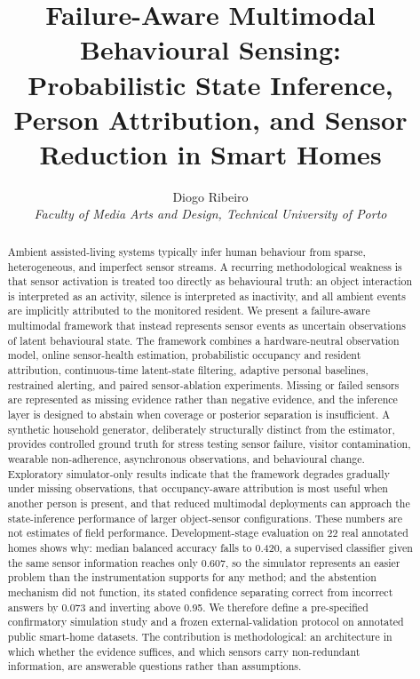 \documentclass[11pt]{article}
\title{Failure-Aware Multimodal Behavioural Sensing:\\
Probabilistic State Inference, Person Attribution, and Sensor Reduction in Smart Homes}
\author{Diogo Ribeiro\\
\small \textit{Faculty of Media Arts and Design, Technical University of Porto}}
\date{}
\begin{document}
\maketitle

\begin{abstract}
Ambient assisted-living systems typically infer human behaviour from sparse, heterogeneous, and imperfect sensor streams. A recurring methodological weakness is that sensor activation is treated too directly as behavioural truth: an object interaction is interpreted as an activity, silence is interpreted as inactivity, and all ambient events are implicitly attributed to the monitored resident. We present a failure-aware multimodal framework that instead represents sensor events as uncertain observations of latent behavioural state. The framework combines a hardware-neutral observation model, online sensor-health estimation, probabilistic occupancy and resident attribution, continuous-time latent-state filtering, adaptive personal baselines, restrained alerting, and paired sensor-ablation experiments. Missing or failed sensors are represented as missing evidence rather than negative evidence, and the inference layer is designed to abstain when coverage or posterior separation is insufficient. A synthetic household generator, deliberately structurally distinct from the estimator, provides controlled ground truth for stress testing sensor failure, visitor contamination, wearable non-adherence, asynchronous observations, and behavioural change. Exploratory simulator-only results indicate that the framework degrades gradually under missing observations, that occupancy-aware attribution is most useful when another person is present, and that reduced multimodal deployments can approach the state-inference performance of larger object-sensor configurations. These numbers are not estimates of field performance. Development-stage evaluation on 22 real annotated homes shows why: median balanced accuracy falls to 0.420, a supervised classifier given the same sensor information reaches only 0.607, so the simulator represents an easier problem than the instrumentation supports for any method; and the abstention mechanism did not function, its stated confidence separating correct from incorrect answers by 0.073 and inverting above 0.95. We therefore define a pre-specified confirmatory simulation study and a frozen external-validation protocol on annotated public smart-home datasets. The contribution is methodological: an architecture in which whether the evidence suffices, and which sensors carry non-redundant information, are answerable questions rather than assumptions.
\end{abstract}
\end{document}
